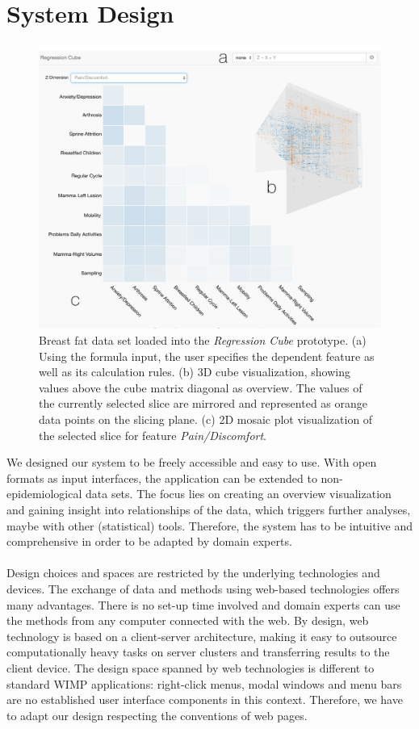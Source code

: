 \documentclass[journal]{style/vgtc} 			          %
\begin{document}
\section{System Design} \label{sec:SystemDesign}
\begin{figure}[htb]
 \centering
 \includegraphics[width=1.0\linewidth]{figures/system}
 \caption{
 Breast fat data set loaded into the \emph{Regression Cube} prototype.
 (a) Using the formula input, the user specifies the dependent feature as well as its calculation rules.
 (b) 3D cube visualization, showing values above the cube matrix diagonal as overview.
 The values of the currently selected slice are mirrored and represented as orange data points on the slicing plane.
 (c) 2D mosaic plot visualization of the selected slice for feature \emph{Pain/Discomfort}.
 }
  \label{fig:System}
\end{figure}
We designed our system to be freely accessible and easy to use.
With open formats as input interfaces, the application can be extended to non-epidemiological data sets.
The focus lies on creating an overview visualization and gaining insight into relationships of the data, which triggers further analyses, maybe with other (statistical) tools.
Therefore, the system has to be intuitive and comprehensive in order to be adapted by domain experts.
\\\\
\noindent Design choices and spaces are restricted by the underlying technologies and devices.
The exchange of data and methods using web-based technologies offers many advantages.
There is no set-up time involved and domain experts can use the methods from any computer connected with the web.
By design, web technology is based on a client-server architecture, making it easy to outsource computationally heavy tasks on server clusters and transferring results to the client device.
The design space spanned by web technologies is different to standard WIMP applications: right-click menus, modal windows and menu bars are no established user interface components in this context.
Therefore, we have to adapt our design respecting the conventions of web pages.
\end{document}
